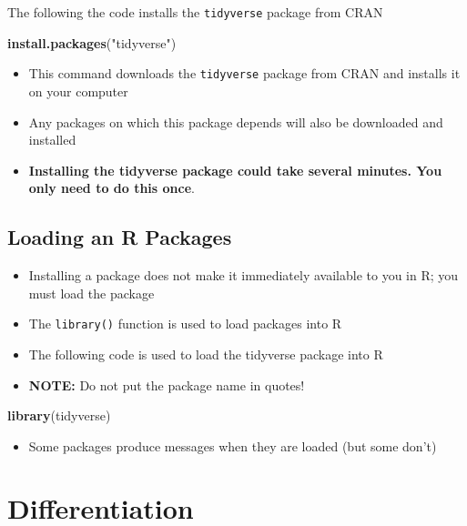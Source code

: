 \documentclass[]{book}
\newenvironment{Shaded}{\begin{snugshade}}{\end{snugshade}}
\newcommand{\KeywordTok}[1]{\textcolor[rgb]{0.13,0.29,0.53}{\textbf{#1}}}
\newcommand{\NormalTok}[1]{#1}
\newcommand{\StringTok}[1]{\textcolor[rgb]{0.31,0.60,0.02}{#1}}
\providecommand{\tightlist}{%
  \setlength{\itemsep}{0pt}\setlength{\parskip}{0pt}}
\begin{document}
The following the code installs the \texttt{tidyverse} package from CRAN

\begin{Shaded}
\begin{Highlighting}[]
\KeywordTok{install.packages}\NormalTok{(}\StringTok{"tidyverse"}\NormalTok{)}
\end{Highlighting}
\end{Shaded}

\begin{itemize}
\item
  This command downloads the \texttt{tidyverse} package from CRAN and installs it on your computer
\item
  Any packages on which this package depends will also be downloaded and installed
\item
  \textbf{Installing the tidyverse package could take several minutes. You only need to do this once}.
\end{itemize}

\hypertarget{loading-an-r-packages}{%
\section{Loading an R Packages}\label{loading-an-r-packages}}

\begin{itemize}
\item
  Installing a package does not make it immediately available to you in R; you must load the package
\item
  The \texttt{library()} function is used to load packages into R
\item
  The following code is used to load the tidyverse package into R
\item
  \textbf{NOTE:} Do not put the package name in quotes!
\end{itemize}

\begin{Shaded}
\begin{Highlighting}[]
\KeywordTok{library}\NormalTok{(tidyverse)}
\end{Highlighting}
\end{Shaded}

\begin{itemize}
\tightlist
\item
  Some packages produce messages when they are loaded (but some don't)
\end{itemize}

\hypertarget{differentiation}{%
\chapter{Differentiation}\label{differentiation}}
\end{document}
